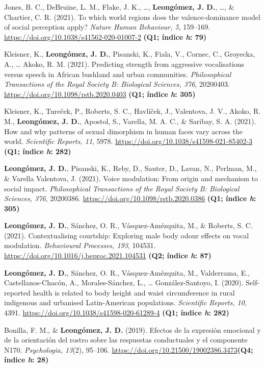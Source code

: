 \documentclass[11pt,a4paper,]{awesome-cv}
\begin{document}
Jones, B. C., DeBruine, L. M., Flake, J. K., \ldots,
\textbf{Leongómez, J. D.}, \ldots, \& Chartier, C. R. (2021). To which
world regions does the valence-dominance model of social perception
apply? \emph{Nature Human Behaviour, 5}, 159--169.
\url{https://doi.org/10.1038/s41562-020-01007-2} \textbf{(Q1; índice
\emph{h}: 79)}

Kleisner, K., \textbf{Leongómez, J. D.}, Pisanski, K., Fiala, V.,
Cornec, C., Groyecka, A., \ldots{} Akoko, R. M. (2021). Predicting
strength from aggressive vocalisations versus speech in African bushland
and urban communities. \emph{Philosophical Transactions of the Royal
Society B: Biological Sciences, 376}, 20200403.
\url{https://doi.org/10.1098/rstb.2020.0403} \textbf{(Q1; índice
\emph{h}: 305)}

Kleisner, K., Tureček, P., Roberts, S. C., Havlíček, J., Valentova, J.
V., Akoko, R. M., \textbf{Leongómez, J. D.}, Apostol, S., Varella, M. A.
C., \& Saribay, S. A. (2021). How and why patterns of sexual dimorphism
in human faces vary across the world. \emph{Scientific Reports, 11},
5978. \url{https://doi.org/10.1038/s41598-021-85402-3} \textbf{(Q1;
índice \emph{h}: 282)}

\textbf{Leongómez, J. D.}, Pisanski, K., Reby, D., Sauter, D., Lavan,
N., Perlman, M., \& Varella Valentova, J. (2021). Voice modulation: From
origin and mechanism to social impact. \emph{Philosophical Transactions
of the Royal Society B: Biological Sciences, 376}, 20200386.
\url{https://doi.org/10.1098/rstb.2020.0386} \textbf{(Q1; índice
\emph{h}: 305)}

\textbf{Leongómez, J. D.}, Sánchez, O. R., Vásquez-Amézquita, M., \&
Roberts, S. C. (2021). Contextualising courtship: Exploring male body
odour effects on vocal modulation. \emph{Behavioural Processes, 193},
104531. \url{https://doi.org/10.1016/j.beproc.2021.104531} \textbf{(Q2;
índice \emph{h}: 87)}

\textbf{Leongómez, J. D.}, Sánchez, O. R., Vásquez-Amézquita, M.,
Valderrama, E., Castellanos-Chacón, A., Morales-Sánchez, L., \ldots{}
González-Santoyo, I. (2020). Self-reported health is related to body
height and waist circumference in rural indigenous and urbanised
Latin-American populations. \emph{Scientific Reports, 10}, 4391.
\url{https://doi.org/10.1038/s41598-020-61289-4} \textbf{(Q1; índice
\emph{h}: 282)}

Bonilla, F. M., \& \textbf{Leongómez, J. D.} (2019). Efectos de la
expresión emocional y de la orientación del rostro sobre las respuestas
conductuales y el componente N170. \emph{Psychologia, 13}(2), 95--106.
\url{https://doi.org/10.21500/19002386.3473}\textbf{(Q4; índice
\emph{h}: 28)}
\end{document}
